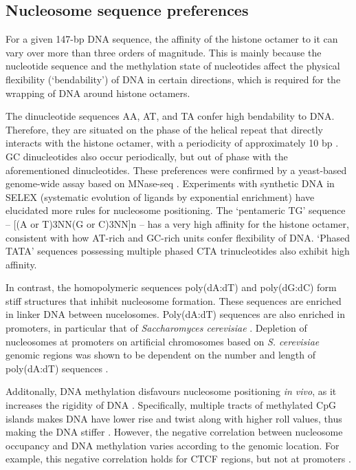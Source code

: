 \documentclass[parskip=full, numbers=noenddot]{scrbook}
\begin{document}
\subsection{Nucleosome sequence preferences}
\label{ssec:emsaselex_intro_seqpref}

For a given 147-bp DNA sequence, the affinity of the histone octamer to it can vary over more than three orders of magnitude.  This is mainly because the nucleotide sequence and the methylation state of nucleotides affect the physical flexibility (`bendability') of DNA in certain directions, which is required for the wrapping of DNA around histone octamers.

The dinucleotide sequences AA, AT, and TA confer high bendability to DNA.  Therefore, they are situated on the phase of the helical repeat that directly interacts with the histone octamer, with a periodicity of approximately 10 bp \citep{struhl_determinants_2013}.  GC dinucleotides also occur periodically, but out of phase with the aforementioned dinucleotides.  These preferences were confirmed by a yeast-based genome-wide assay based on MNase-seq \citep{segal_genomic_2006}.  Experiments with synthetic DNA in SELEX (systematic evolution of ligands by exponential enrichment) \citep{lowary_new_1998} have elucidated more rules for nucleosome positioning.  The `pentameric TG' sequence -- [(A or T)3NN(G or C)3NN]n -- has a very high affinity for the histone octamer, consistent with how AT-rich and GC-rich units confer flexibility of DNA.  `Phased TATA' sequences possessing multiple phased CTA trinucleotides also exhibit high affinity.

In contrast, the homopolymeric sequences poly(dA:dT) and poly(dG:dC) form stiff structures that inhibit nucleosome formation.  These sequences are enriched in linker DNA between nucelosomes.  Poly(dA:dT) sequences are also enriched in promoters, in particular that of \emph{Saccharomyces cerevisiae} \citep{struhl_determinants_2013}.  Depletion of nucleosomes at promoters on artificial chromosomes based on \emph{S. cerevisiae} genomic regions was shown to be dependent on the number and length of poly(dA:dT) sequences \citep{hughes_functional_2012}.

Additonally, DNA methylation disfavours nucleosome positioning \emph{in vivo}, as it increases the rigidity of DNA \citep{huff_dnmt1-independent_2014}.  Specifically, multiple tracts of methylated CpG islands makes DNA have lower rise and twist along with higher roll values, thus making the DNA stiffer \citep{rao_systematic_2018, perez_impact_2012}.  However, the negative correlation between nucleosome occupancy and DNA methylation varies according to the genomic location.  For example, this negative correlation holds for CTCF regions, but not at promoters \citep{kelly_genome-wide_2012}.
\end{document}
